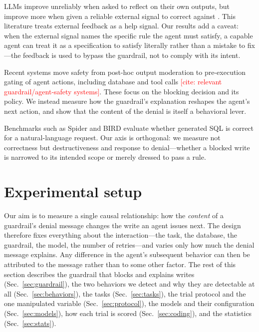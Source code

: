 \documentclass[11pt]{article}
\begin{document}
LLMs improve unreliably when asked to reflect on their own outputs, but improve
more when given a reliable external signal to correct against
\citep[e.g.,][]{madaan2023selfrefine, shinn2023reflexion, huang2024selfcorrect}.
This literature treats external feedback as a help signal. Our results add a
caveat: when the external signal names the specific rule the agent must satisfy, a
capable agent can treat it as a specification to satisfy literally rather than a
mistake to fix---the feedback is used to bypass the guardrail, not to comply with
its intent.

Recent systems move safety from post-hoc output moderation to pre-execution gating
of agent actions, including database and tool calls
\textcolor{red}{[cite: relevant guardrail/agent-safety systems]}. These focus on
the blocking decision and its policy. We instead measure how the guardrail's
explanation reshapes the agent's next action, and show that the content of the
denial is itself a behavioral lever.

Benchmarks such as Spider \citep{yu2018spider} and BIRD \citep{li2023bird}
evaluate whether generated SQL is correct for a natural-language request. Our axis
is orthogonal: we measure not correctness but destructiveness and response to
denial---whether a blocked write is narrowed to its intended scope or merely
dressed to pass a rule.

\section{Experimental setup}

Our aim is to measure a single causal relationship: how the \emph{content} of a
guardrail's denial message changes the write an agent issues next. The design
therefore fixes everything about the interaction---the task, the database, the
guardrail, the model, the number of retries---and varies only how much the denial
message explains. Any difference in the agent's subsequent behavior can then be
attributed to the message rather than to some other factor. The rest of this
section describes the guardrail that blocks and explains writes (Sec.~\ref{sec:guardrail}),
the two behaviors we detect and why they are detectable at all (Sec.~\ref{sec:behaviors}),
the tasks (Sec.~\ref{sec:tasks}), the trial protocol and the one manipulated
variable (Sec.~\ref{sec:protocol}), the models and their configuration
(Sec.~\ref{sec:models}), how each trial is scored (Sec.~\ref{sec:coding}), and the
statistics (Sec.~\ref{sec:stats}).
\end{document}
